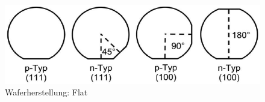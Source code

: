 		\begin{figure}[h!]
			\centering
			\includegraphics[width=\textwidth]{Kapitel/Kap02/orientierungen.PNG}
			\caption{Waferherstellung: Flat}
			\label{02_flat}
		\end{figure}

